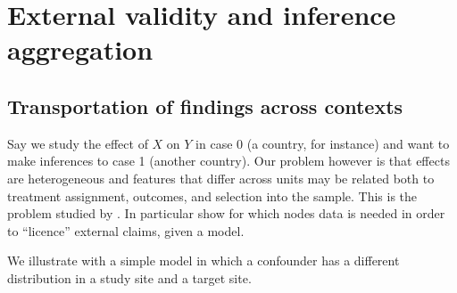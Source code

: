 \documentclass[
  12pt,
]{book}
\newenvironment{Shaded}{\begin{snugshade}}{\end{snugshade}}
\newcommand{\DataTypeTok}[1]{\textcolor[rgb]{0.13,0.29,0.53}{#1}}
\newcommand{\DecValTok}[1]{\textcolor[rgb]{0.00,0.00,0.81}{#1}}
\newcommand{\FloatTok}[1]{\textcolor[rgb]{0.00,0.00,0.81}{#1}}
\newcommand{\KeywordTok}[1]{\textcolor[rgb]{0.13,0.29,0.53}{\textbf{#1}}}
\newcommand{\NormalTok}[1]{#1}
\newcommand{\OperatorTok}[1]{\textcolor[rgb]{0.81,0.36,0.00}{\textbf{#1}}}
\newcommand{\StringTok}[1]{\textcolor[rgb]{0.31,0.60,0.02}{#1}}
\begin{document}
\hypertarget{external-validity-and-inference-aggregation}{%
\chapter{External validity and inference aggregation}\label{external-validity-and-inference-aggregation}}

\hypertarget{transportation-of-findings-across-contexts}{%
\section{Transportation of findings across contexts}\label{transportation-of-findings-across-contexts}}

Say we study the effect of \(X\) on \(Y\) in case 0 (a country, for instance) and want to make inferences to case 1 (another country). Our problem however is that effects are heterogeneous and features that differ across units may be related both to treatment assignment, outcomes, and selection into the sample. This is the problem studied by \citet{pearl2014external}. In particular \citet{pearl2014external} show for which nodes data is needed in order to ``licence'' external claims, given a model.

We illustrate with a simple model in which a confounder has a different distribution in a study site and a target site.

\begin{Shaded}
\end{Shaded}
\end{document}
